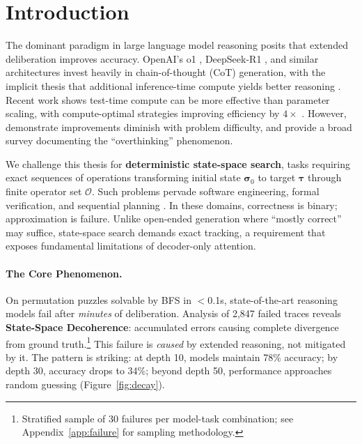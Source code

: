 \documentclass{article}
\theoremstyle{plain}
\theoremstyle{definition}
\theoremstyle{remark}
\newcommand{\state}{\boldsymbol{\sigma}}
\newcommand{\target}{\boldsymbol{\tau}}
\newcommand{\ops}{\mathcal{O}}
\begin{document}

\section{Introduction}
\label{sec:intro}

The dominant paradigm in large language model reasoning posits that extended deliberation improves accuracy. OpenAI's o1 \citep{openai2024o1}, DeepSeek-R1 \citep{guo2025deepseek}, and similar architectures invest heavily in chain-of-thought (CoT) generation, with the implicit thesis that additional inference-time compute yields better reasoning \citep{snell2025scaling,brown2024large}. Recent work shows test-time compute can be more effective than parameter scaling, with compute-optimal strategies improving efficiency by $4\times$ \citep{snell2025scaling,li2024scaling}. However, \citet{balachandran2025inference} demonstrate improvements diminish with problem difficulty, and \citet{sui2025stop} provide a broad survey documenting the ``overthinking'' phenomenon.

We challenge this thesis for \textbf{deterministic state-space search}, tasks requiring exact sequences of operations transforming initial state $\state_0$ to target $\target$ through finite operator set $\ops$. Such problems pervade software engineering, formal verification, and sequential planning \citep{dziri2024faith,kambhampati2024llms,valmeekam2023planning}. In these domains, correctness is binary; approximation is failure. Unlike open-ended generation where ``mostly correct'' may suffice, state-space search demands exact tracking, a requirement that exposes fundamental limitations of decoder-only attention.

\paragraph{The Core Phenomenon.} On permutation puzzles solvable by BFS in $<$0.1s, state-of-the-art reasoning models fail after \emph{minutes} of deliberation. Analysis of 2,847 failed traces reveals \textbf{State-Space Decoherence}: accumulated errors causing complete divergence from ground truth.\footnote{Stratified sample of 30 failures per model-task combination; see Appendix~\ref{app:failure} for sampling methodology.} This failure is \emph{caused} by extended reasoning, not mitigated by it. The pattern is striking: at depth 10, models maintain 78\% accuracy; by depth 30, accuracy drops to 34\%; beyond depth 50, performance approaches random guessing (Figure~\ref{fig:decay}).
\end{document}

